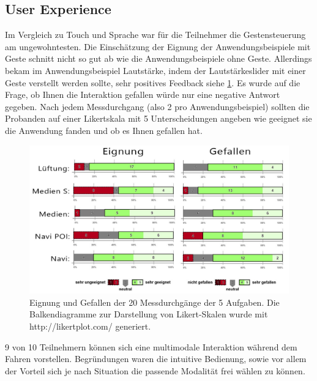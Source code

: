 \subsection[User Experience]{User Experience}
Im Vergleich zu Touch und Sprache war für die Teilnehmer die Gestensteuerung am ungewohntesten. 
Die Einschätzung der Eignung der Anwendungsbeispiele mit Geste schnitt nicht so gut ab wie die Anwendungsbeispiele ohne Geste. Allerdings bekam im Anwendungsbeispiel Lautstärke, indem der Lautstärkeslider mit einer Geste verstellt werden sollte, sehr positives Feedback siehe \ref{fig:Smiley_Eignung_Gefallen}. Es wurde auf die Frage, ob Ihnen die Interaktion gefallen würde nur eine negative Antwort gegeben. Nach jedem Messdurchgang (also 2 pro Anwendungsbeispiel) sollten die Probanden auf einer Likertskala mit 5 Unterscheidungen angeben wie geeignet sie die Anwendung fanden und ob es Ihnen gefallen hat.
\begin{figure}[ht]
	\centering
		\includegraphics[width=1\textwidth]{img/Smiley_Eignung_Gefallen.jpg}
	\caption[Eignung und Gefallen der 5 Aufgaben]{Eignung und Gefallen der 20 Messdurchgänge der 5 Aufgaben. Die Balkendiagramme zur Darstellung von Likert-Skalen wurde mit http://likertplot.com/ generiert.}
	\label{fig:Smiley_Eignung_Gefallen}
\end{figure}
 
9 von 10 Teilnehmern können sich eine multimodale Interaktion während dem Fahren vorstellen. Begründungen waren die intuitive Bedienung, sowie vor allem der Vorteil sich je nach Situation die passende Modalität frei wählen zu können.

